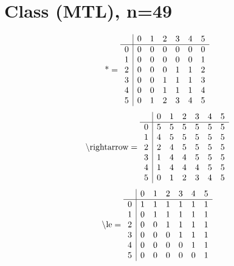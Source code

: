 \documentclass[11pt]{article}
\begin{document}
\section{Class (MTL), n=49}
\[\text{*} = 
\begin{array}{r | r r r r r r}
 & 0 & 1 & 2 & 3 & 4 & 5 \\ \hline
0 & 0 & 0 & 0 & 0 & 0 & 0 \\
1 & 0 & 0 & 0 & 0 & 0 & 1 \\
2 & 0 & 0 & 0 & 1 & 1 & 2 \\
3 & 0 & 0 & 1 & 1 & 1 & 3 \\
4 & 0 & 0 & 1 & 1 & 1 & 4 \\
5 & 0 & 1 & 2 & 3 & 4 & 5 \\
\end{array}
\]
\[\text{\textbackslash rightarrow} = 
\begin{array}{r | r r r r r r}
 & 0 & 1 & 2 & 3 & 4 & 5 \\ \hline
0 & 5 & 5 & 5 & 5 & 5 & 5 \\
1 & 4 & 5 & 5 & 5 & 5 & 5 \\
2 & 2 & 4 & 5 & 5 & 5 & 5 \\
3 & 1 & 4 & 4 & 5 & 5 & 5 \\
4 & 1 & 4 & 4 & 4 & 5 & 5 \\
5 & 0 & 1 & 2 & 3 & 4 & 5 \\
\end{array}
\]
\[\text{\textbackslash le} = 
\begin{array}{r | r r r r r r}
 & 0 & 1 & 2 & 3 & 4 & 5 \\ \hline
0 & 1 & 1 & 1 & 1 & 1 & 1 \\
1 & 0 & 1 & 1 & 1 & 1 & 1 \\
2 & 0 & 0 & 1 & 1 & 1 & 1 \\
3 & 0 & 0 & 0 & 1 & 1 & 1 \\
4 & 0 & 0 & 0 & 0 & 1 & 1 \\
5 & 0 & 0 & 0 & 0 & 0 & 1 \\
\end{array}
\]
\end{document}
